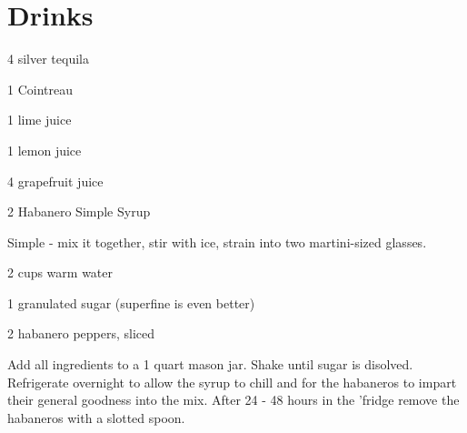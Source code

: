 
\chapter{Drinks}


%
%
%
%
\newpage



\begin{IngredientsAndSteps}
    \ListIngredientsAndSteps
    {
        4 \Ounce silver tequila

        1 \Ounce Cointreau

        1 \Ounce lime juice

        1 \Ounce lemon juice

        4 \Ounce grapefruit juice

        2 \Ounce Habanero Simple Syrup
    }
    {
        Simple - mix it together, stir with ice, strain into two martini-sized glasses.
    }
\end{IngredientsAndSteps}

%
%
%
%
\newpage



\begin{IngredientsAndSteps}
    \ListIngredientsAndSteps
    {
        2 cups warm water

        1 granulated sugar (superfine is even better)

        2 habanero peppers, sliced
    }
    {
        Add all ingredients to a 1 quart mason jar. Shake until sugar is disolved. Refrigerate
        overnight to allow the syrup to chill and for the habaneros to impart their general
        goodness into the mix. After 24 - 48 hours in the 'fridge remove the habaneros with a
        slotted spoon.
    }
\end{IngredientsAndSteps}

